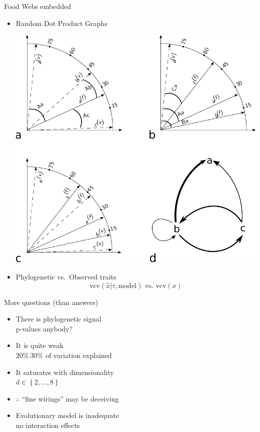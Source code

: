 \documentclass[ignorenonframetext,]{beamer}
\begin{document}
\begin{frame}{Food Webs embedded}

\begin{itemize}[<+->]
\centering
\item
Random Dot Product Graphs

  \includegraphics[width=0.4\linewidth]{images/RDPGmodel.pdf}

\item
Phylogenetic vs.~Observed traits
  \begin{equation*}
    \textrm{vcv}\left( \hat{x} | \tau, \mbox{model} \right) \mbox{ vs. } \textrm{vcv}\left(x\right)
  \end{equation*}

\end{itemize}

\end{frame}

\begin{frame}{More questions (than answers)}

\begin{itemize}[<+->]
\itemsep1pt\parskip0pt
\item
  There is phylogenetic signal\\
  {\tiny p-values anybody?}
\item
  It is quite weak\\
  {\tiny $20\% ~ 30\%$ of variation explained}
\item
  It saturates with dimensionality\\
  {\tiny $d \in \left\{2, \dots , 8 \right\}$}
\item
  $\therefore$ ``fine wirings'' may be deceiving
\item
  Evolutionary model is inadequate\\
  {\tiny no interaction effects}
\end{itemize}

\end{frame}
\end{document}
